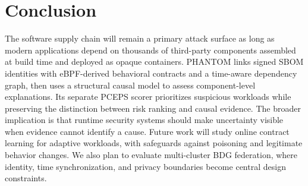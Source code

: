 \documentclass[conference]{IEEEtran}
\begin{document}
\section{Conclusion}
The software supply chain will remain a primary attack surface as long as modern applications depend on thousands of third-party components assembled at build time and deployed as opaque containers. PHANTOM links signed SBOM identities with eBPF-derived behavioral contracts and a time-aware dependency graph, then uses a structural causal model to assess component-level explanations. Its separate PCEPS scorer prioritizes suspicious workloads while preserving the distinction between risk ranking and causal evidence. The broader implication is that runtime security systems should make uncertainty visible when evidence cannot identify a cause. Future work will study online contract learning for adaptive workloads, with safeguards against poisoning and legitimate behavior changes. We also plan to evaluate multi-cluster BDG federation, where identity, time synchronization, and privacy boundaries become central design constraints.
\end{document}
